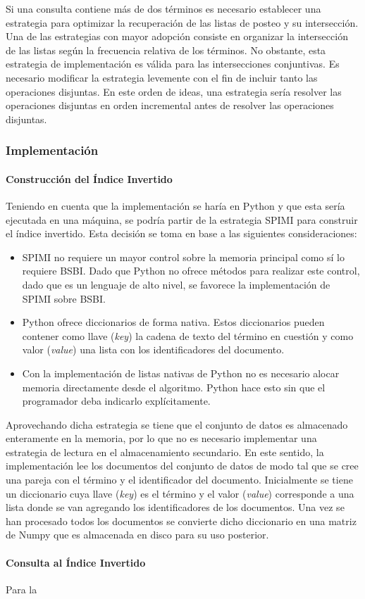 Si una consulta contiene más de dos términos es necesario establecer una estrategia para optimizar la recuperación de las listas de posteo y su intersección. Una de las estrategias con mayor adopción consiste en organizar la intersección de las listas según la frecuencia relativa de los términos. No obstante, esta estrategia de implementación es válida para las intersecciones conjuntivas. Es necesario modificar la estrategia levemente con el fin de incluir tanto las operaciones disjuntas. En este orden de ideas, una estrategia sería resolver las operaciones disjuntas en orden incremental antes de resolver las operaciones disjuntas.


\subsubsection{Implementación}

\paragraph{Construcción del Índice Invertido}
Teniendo en cuenta que la implementación se haría en Python y que esta sería ejecutada en una máquina, se podría partir de la estrategia SPIMI para construir el índice invertido. Esta decisión se toma en base a las siguientes consideraciones:

\begin{itemize}
    \item SPIMI no requiere un mayor control sobre la memoria principal como sí lo requiere BSBI. Dado que Python no ofrece métodos para realizar este control, dado que es un lenguaje de alto nivel, se favorece la implementación de SPIMI sobre BSBI.
    \item Python ofrece diccionarios de forma nativa. Estos diccionarios pueden contener como llave (\textit{key}) la cadena de texto del término en cuestión y como valor (\textit{value}) una lista con los identificadores del documento.
    \item Con la implementación de listas nativas de Python no es necesario alocar memoria directamente desde el algoritmo. Python hace esto sin que el programador deba indicarlo explícitamente.
\end{itemize}

Aprovechando dicha estrategia se tiene que el conjunto de datos es almacenado enteramente en la memoria, por lo que no es necesario implementar una estrategia de lectura en el almacenamiento secundario. En este sentido, la implementación lee los documentos del conjunto de datos de modo tal que se cree una pareja con el término y el identificador del documento. Inicialmente se tiene un diccionario cuya llave (\textit{key}) es el término y el valor (\textit{value}) corresponde a una lista donde se van agregando los identificadores de los documentos. Una vez se han procesado todos los documentos se convierte dicho diccionario en una matriz de Numpy que es almacenada en disco para su uso posterior. 

\paragraph{Consulta al Índice Invertido}
Para la 



